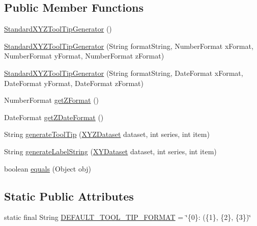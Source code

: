 \subsection*{Public Member Functions}
\begin{DoxyCompactItemize}
\item 
\mbox{\hyperlink{classorg_1_1jfree_1_1chart_1_1labels_1_1_standard_x_y_z_tool_tip_generator_a1bc0700851cf5fea7e4a6760389ce568}{Standard\+X\+Y\+Z\+Tool\+Tip\+Generator}} ()
\item 
\mbox{\hyperlink{classorg_1_1jfree_1_1chart_1_1labels_1_1_standard_x_y_z_tool_tip_generator_acbb0f8c0a476b9d8d96fbb41c541eb24}{Standard\+X\+Y\+Z\+Tool\+Tip\+Generator}} (String format\+String, Number\+Format x\+Format, Number\+Format y\+Format, Number\+Format z\+Format)
\item 
\mbox{\hyperlink{classorg_1_1jfree_1_1chart_1_1labels_1_1_standard_x_y_z_tool_tip_generator_a912de15b04cccefd22a56d429fa68628}{Standard\+X\+Y\+Z\+Tool\+Tip\+Generator}} (String format\+String, Date\+Format x\+Format, Date\+Format y\+Format, Date\+Format z\+Format)
\item 
Number\+Format \mbox{\hyperlink{classorg_1_1jfree_1_1chart_1_1labels_1_1_standard_x_y_z_tool_tip_generator_a77c36bbf1619e07989462c462d3d9da5}{get\+Z\+Format}} ()
\item 
Date\+Format \mbox{\hyperlink{classorg_1_1jfree_1_1chart_1_1labels_1_1_standard_x_y_z_tool_tip_generator_a74850d26e210cdfbb7d06836f230a8a6}{get\+Z\+Date\+Format}} ()
\item 
String \mbox{\hyperlink{classorg_1_1jfree_1_1chart_1_1labels_1_1_standard_x_y_z_tool_tip_generator_a1f815d68ce2f2c4d0771ca71566b6888}{generate\+Tool\+Tip}} (\mbox{\hyperlink{interfaceorg_1_1jfree_1_1data_1_1xy_1_1_x_y_z_dataset}{X\+Y\+Z\+Dataset}} dataset, int series, int item)
\item 
String \mbox{\hyperlink{classorg_1_1jfree_1_1chart_1_1labels_1_1_standard_x_y_z_tool_tip_generator_a16079dca079a3ba96e988ef0f93125d2}{generate\+Label\+String}} (\mbox{\hyperlink{interfaceorg_1_1jfree_1_1data_1_1xy_1_1_x_y_dataset}{X\+Y\+Dataset}} dataset, int series, int item)
\item 
boolean \mbox{\hyperlink{classorg_1_1jfree_1_1chart_1_1labels_1_1_standard_x_y_z_tool_tip_generator_ae8415396164418fde46c1ed4c468ecf8}{equals}} (Object obj)
\end{DoxyCompactItemize}
\subsection*{Static Public Attributes}
\begin{DoxyCompactItemize}
\item 
static final String \mbox{\hyperlink{classorg_1_1jfree_1_1chart_1_1labels_1_1_standard_x_y_z_tool_tip_generator_af39831d93c95f500eac1658ddb02da3d}{D\+E\+F\+A\+U\+L\+T\+\_\+\+T\+O\+O\+L\+\_\+\+T\+I\+P\+\_\+\+F\+O\+R\+M\+AT}} = \char`\"{}\{0\}\+: (\{1\}, \{2\}, \{3\})\char`\"{}
\end{DoxyCompactItemize}
